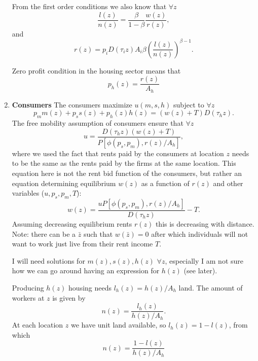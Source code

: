 \documentclass[10pt]{article}
\begin{document}
\begin{enumerate}
From the first order conditions we also know that $\forall z$
\begin{equation}
\frac{l(z)}{n(z)}=\frac{\beta}{1-\beta}\frac{w(z)}{r(z)},
\end{equation}
and
\begin{equation}
r(z)=p_iD(\tau_i z)A_i\beta\left(\frac{l(z)}{n(z)}\right)^{\beta-1}.
\end{equation}

Zero profit condition in the housing sector means that
\begin{equation}
p_h(z)=\frac{r(z)}{A_h}
\end{equation}

\item \textbf{Consumers}
The consumers maximize $u(m,s,h)$ subject to $\forall z$
\begin{equation*}
p_mm(z)+p_ss(z)+p_h(z)h(z)=(w(z)+T)D(\tau_hz).
\end{equation*}
The free mobility assumption of consumers ensure that $\forall z$
\begin{equation}
u=\frac{D(\tau_hz)(w(z)+T)}{P\left[\phi(p_s,p_m),r(z)/A_h\right]},
\end{equation}
where we used the fact that rents paid by the consumers at location $z$ needs to be the same as the rents paid by the firms at the same location. This equation here is not the rent bid function of the consumers, but rather an equation determining equilibrium $w(z)$ as a function of $r(z)$ and other variables ($u, p_s, p_m,T$):
\begin{equation*}
w(z)=\frac{uP\left[\phi(p_s,p_m),r(z)/A_h\right]}{D(\tau_hz)}-T.
\end{equation*}
Assuming decreasing equilibrium rents $r(z)$ this is decreasing with distance. Note: there can be a $\bar{z}$ such that $w(\bar{z})=0$ after which individuals will not want to work just live from their rent income $T$.

I will need solutions for $m(z),s(z),h(z)$ $\forall z$, especially I am not sure how we can go around having an expression for $h(z)$ (see later).

Producing $h(z)$ housing needs $l_h(z)=h(z)/A_h$ land. The amount of workers at $z$ is given by
\begin{equation*}
n(z)=\frac{l_h(z)}{h(z)/A_h}.
\end{equation*}
At each location $z$ we have unit land available, so $l_h(z)=1-l(z)$, from which
\begin{equation}
n(z)=\frac{1-l(z)}{h(z)/A_h}
\end{equation}


\end{enumerate}
\end{document}
